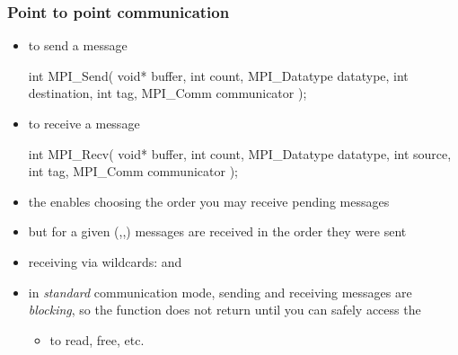 %
%


\begin{frame}[fragile]
%
  \frametitle{Point to point communication}
%
  \begin{itemize}
%
  \item to send a message
    \begin{C}
int MPI_Send(
        void* buffer, int count, MPI_Datatype datatype,
        int destination, int tag, MPI_Comm communicator
        );
   \end{C}
%
  \item to receive a message
    \begin{C}
int MPI_Recv(
        void* buffer, int count, MPI_Datatype datatype,
        int source, int tag, MPI_Comm communicator
        );
   \end{C}
%
  \item the  enables choosing the order you may receive pending messages
%
  \item but for a given (,,)
    messages are received in the order they were sent
%
  \item receiving via wildcards:  and 
% 
  \item in {\em standard} communication mode, sending and receiving messages are {\em blocking},
   so the function does not return until you can safely access the 
   \begin{itemize}
   \item to read, free, etc.
   \end{itemize}
%
  \end{itemize}
%
\end{frame}

